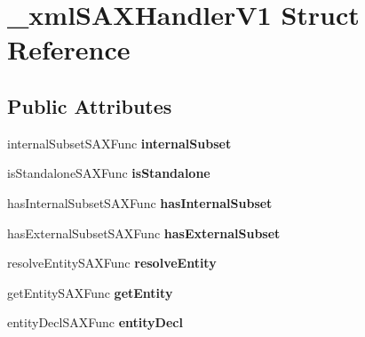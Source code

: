 \hypertarget{struct__xml_s_a_x_handler_v1}{}\section{\+\_\+xml\+S\+A\+X\+Handler\+V1 Struct Reference}
\label{struct__xml_s_a_x_handler_v1}
\subsection*{Public Attributes}
\begin{DoxyCompactItemize}
\item 
\mbox{\label{struct__xml_s_a_x_handler_v1_a42f4e20c793c236300b6101d49212580}} 
internal\+Subset\+S\+A\+X\+Func {\bfseries internal\+Subset}
\item 
\mbox{\label{struct__xml_s_a_x_handler_v1_a4b9bd1931ab440bd5b7d9df8009440bc}} 
is\+Standalone\+S\+A\+X\+Func {\bfseries is\+Standalone}
\item 
\mbox{\label{struct__xml_s_a_x_handler_v1_afe7c41e644a1152afd4bc13fe56a60de}} 
has\+Internal\+Subset\+S\+A\+X\+Func {\bfseries has\+Internal\+Subset}
\item 
\mbox{\label{struct__xml_s_a_x_handler_v1_a0ca8a76baf0d76b04d914ad9a56c4506}} 
has\+External\+Subset\+S\+A\+X\+Func {\bfseries has\+External\+Subset}
\item 
\mbox{\label{struct__xml_s_a_x_handler_v1_a949a9307787020339ed0d46376a676ea}} 
resolve\+Entity\+S\+A\+X\+Func {\bfseries resolve\+Entity}
\item 
\mbox{\label{struct__xml_s_a_x_handler_v1_a6d00cd90884aff134c70cfed77798cdb}} 
get\+Entity\+S\+A\+X\+Func {\bfseries get\+Entity}
\item 
\mbox{\label{struct__xml_s_a_x_handler_v1_ab8767df981b572d1a4bb72de4eece794}} 
entity\+Decl\+S\+A\+X\+Func {\bfseries entity\+Decl}
\item 
\mbox{\label{struct__xml_s_a_x_handler_v1_a46b3e77687757223f11de89d19290e78}} 

\end{DoxyCompactItemize}
